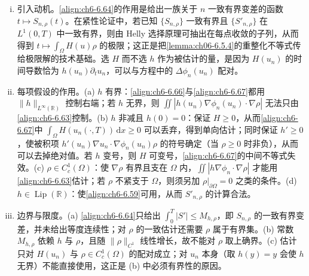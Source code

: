 \documentclass[../../main.tex]{subfiles}%
\begin{document}
\begin{remark}\label{remark:ch06-6.5.6动机}
\begin{enumerate}[(i)]
\item 引入动机。\eqref{align:ch6-6.64}的作用是给出一族关于 $n$ 一致有界变差的函数 $t\mapsto S_{n,\rho}(t)$。在紧性论证中，若已知 $\{S_{n,\rho}\}$ 一致有界且 $\{S'_{n,\rho}\}$ 在 $L^1(0,T)$ 中一致有界，则由 Helly 选择原理可抽出在每点收敛的子列，从而得到 $t\mapsto\int_\Omega H(u)\rho$ 的极限；这正是把\cref{lemma:ch06-6.5.4}的重整化不等式传给极限解的技术基础。选 $H$ 而不选 $h$ 作为被估计的量，是因为 $H(u_n)$ 的时间导数恰为 $h(u_n)\partial_tu_n$，可以与方程中的 $\Delta\phi_n(u_n)$ 配对。
\item 每项假设的作用。(a) $h$ 有界：\eqref{align:ch6-6.66}与\eqref{align:ch6-6.67}都用 $\|h\|_{L^\infty(\mathbb{R})}$ 控制右端；若 $h$ 无界，则 $\iint|h(u_n)\nabla\phi_n(u_n)\cdot\nabla\rho|$ 无法只由\eqref{align:ch6-6.63}控制。(b) $h$ 非减且 $h(0)=0$：保证 $H\geqslant0$，从而\eqref{align:ch6-6.67}中 $\int_\Omega H(u_n(\cdot,T))\,\mathrm{d}x\geqslant0$ 可以丢弃，得到单向估计；同时保证 $h'\geqslant0$，使被积项 $h'(u_n)\nabla u_n\cdot\nabla\phi_n(u_n)\rho$ 的符号确定（当 $\rho\geqslant0$ 时非负），从而可以去掉绝对值。若 $h$ 变号，则 $H$ 可变号，\eqref{align:ch6-6.67}的中间不等式失效。(c) $\rho\in C^1_c(\Omega)$：使 $\nabla\rho$ 有界且支在 $\Omega$ 内，$\iint|h\nabla\phi_n\cdot\nabla\rho|$ 才能用\eqref{align:ch6-6.63}估计；若 $\rho$ 不紧支于 $\Omega$，则须另加 $\rho|_{\partial\Omega}=0$ 之类的条件。(d) $h\in\operatorname{Lip}(\mathbb{R})$：使\eqref{align:ch6-6.59}可用，从而 $S'_{n,\rho}$ 的计算合法。
\item 边界与限度。(a) \eqref{align:ch6-6.64}只给出 $\int_0^T|S'|\leqslant M_{h,\rho}$，即 $S_{n,\rho}$ 的一致有界变差，并未给出等度连续性；对 $\rho$ 的一致估计还需要 $\rho$ 属于有界集。(b) 常数 $M_{h,\rho}$ 依赖 $h$ 与 $\rho$，且随 $\|\rho\|_{C^1}$ 线性增长，故不能对 $\rho$ 取上确界。(c) 估计只对 $H(u_n)$ 与 $\rho\in C^1_c(\Omega)$ 的配对成立；对 $u_n$ 本身（取 $h(y)=y$ 会使 $h$ 无界）不能直接使用，这正是 (b) 中必须有界性的原因。
\end{enumerate}
\end{remark}
\end{document}
